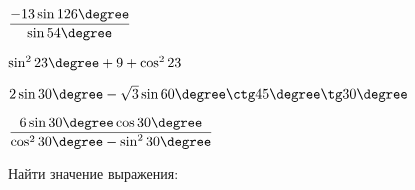\begin{class}[number=5]
\begin{listofex}
\begin{enumcols}[itemcolumns=2]
			\item \( \dfrac{-13\sin126\degree}{\sin54\degree} \)
			\item \( \sin^223\degree+9+\cos^223 \)
			\item \( 2\sin30\degree-\sqrt{3}\sin60\degree\ctg45\degree\tg30\degree\)
			\item \( \dfrac{6\sin30\degree\cos30\degree}{\cos^230\degree-\sin^230\degree} \)
		\end{enumcols}
		\item Найти значение выражения:
		\begin{enumcols}[itemcolumns=1]
			\item {}
			\item {}
			\item {}
			\item {}
		\end{enumcols}
	\end{listofex}
\end{class}
%
%
%	
%
%
%
%	
%
%
%	
%
%
%	
